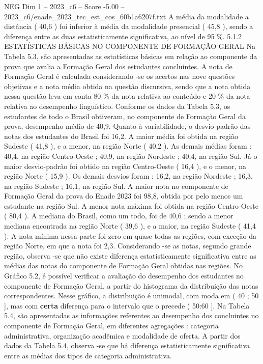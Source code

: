 \begin{textsample}{NEG Dim 1 – 2023\_c6 – Score -5.00 – 2023\_c6/enade\_2023\_tec\_est\_cos\_60b1a6207f.txt}
A média da modalidade a distância ( 40,6 ) foi inferior à média da modalidade presencial ( 45,8 ), sendo a diferença entre as duas estatisticamente significativa, ao nível de 95 \%. 5.1.2 ESTATÍSTICAS BÁSICAS NO COMPONENTE DE FORMAÇÃO GERAL Na Tabela 5.3, são apresentadas as estatísticas básicas em relação ao componente da prova que avalia a Formação Geral dos estudantes concluintes.
A nota de Formação Geral é calculada considerando -se os acertos nas nove questões objetivas e a nota média obtida na questão discursiva, sendo que a nota obtida nessa questão leva em conta 80 \% da nota relativa ao conteúdo e 20 \% da nota relativa ao desempenho linguístico.
Conforme os dados da Tabela 5.3, os estudantes de todo o Brasil obtiveram, no componente de Formação Geral da prova, desempenho médio de 40,9.
Quanto à variabilidade, o desvio-padrão das notas dos estudantes do Brasil foi 16,2.
A maior média foi obtida na região Sudeste ( 41,8 ), e a menor, na região Norte ( 40,2 ).
As demais médias foram : 40,4, na região Centro-Oeste ; 40,9, na região Nordeste ; 40,4, na região Sul.
Já o maior desvio-padrão foi obtido na região Centro-Oeste ( 16,4 ), e o menor, na região Norte ( 15,9 ).
Os demais desvios foram : 16,2, na região Nordeste ; 16,3, na região Sudeste ; 16,1, na região Sul.
A maior nota no componente de Formação Geral da prova do Enade 2023 foi 98,8, obtida por pelo menos um estudante na região Sul.
A menor nota máxima foi obtida na região Centro-Oeste ( 80,4 ).
A mediana do Brasil, como um todo, foi de 40,6 ; sendo a menor mediana encontrada na região Norte ( 39,6 ), e a maior, na região Sudeste ( 41,4 ).
A nota mínima nessa parte foi zero em quase todas as regiões, com exceção da região Norte, em que a nota foi 2,3.
Considerando -se as notas, segundo grande região, observa -se que não existe diferença estatisticamente significativa entre as médias das notas do componente de Formação Geral obtidas nas regiões.
No Gráfico 5.2, é possível verificar a avaliação do desempenho dos estudantes no componente de Formação Geral, a partir do histograma da distribuição das notas correspondentes.
Nesse gráfico, a distribuição é unimodal, com moda em ( 40 ; 50 ], mas com \textbf{certa} diferença para o intervalo que o precede ( 50:60 ].
Na Tabela 5.4, são apresentadas as informações referentes ao desempenho dos concluintes no componente de Formação Geral, em diferentes agregações : categoria administrativa, organização acadêmica e modalidade de oferta.
A partir dos dados da Tabela 5.4, observa -se que há diferença estatisticamente significativa entre as médias dos tipos de categoria administrativa.

\end{textsample}
